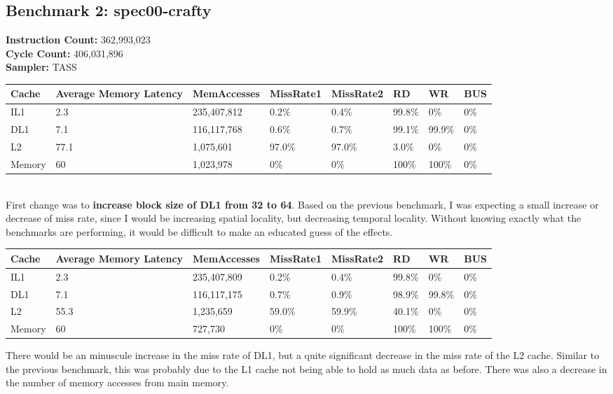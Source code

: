 \documentclass[12pt]{article}
\begin{document}
\subsection*{Benchmark 2: spec00-crafty}
\textbf{Instruction Count:} 362,993,023\\
\textbf{Cycle Count:} 406,031,896\\
\textbf{Sampler:} TASS\\
\begin{table}[!h]
\centering
\begin{tabular}{|l|l|l|l|l|l|l|l|}
\hline
\rowcolor[HTML]{C0C0C0} 
Cache & Average Memory Latency & MemAccesses & MissRate1 & MissRate2 & RD & WR & BUS \\ \hline
IL1 & 2.3 & 235,407,812 & 0.2\% & 0.4\% & 99.8\% & 0\% & 0\% \\ \hline
DL1 & 7.1 & 116,117,768 & 0.6\% & 0.7\% & 99.1\% & 99.9\% & 0\% \\ \hline
L2 & 77.1 & 1,075,601 & 97.0\% & 97.0\% & 3.0\% & 0\% & 0\% \\ \hline
Memory & 60 & 1,023,978 & 0\% & 0\% & 100\% & 100\% & 0\% \\ \hline
\end{tabular}
\end{table}\\
First change was to \textbf{increase block size of DL1 from 32 to 64}. Based on the previous benchmark, I was expecting a small increase or decrease of miss rate, since I would be increasing spatial locality, but decreasing temporal locality. Without knowing exactly what the benchmarks are performing, it would be difficult to make an educated guess of the effects.\\
\begin{table}[!h]
\centering
\begin{tabular}{|l|l|l|l|l|l|l|l|}
\hline
\rowcolor[HTML]{C0C0C0} 
Cache & Average Memory Latency & MemAccesses & MissRate1 & MissRate2 & RD & WR & BUS \\ \hline
IL1 & 2.3 & 235,407,809 & 0.2\% & 0.4\% & 99.8\% & 0\% & 0\% \\ \hline
DL1 & 7.1 & 116,117,175 & 0.7\% & 0.9\% & 98.9\% & 99.8\% & 0\% \\ \hline
L2 & 55.3 & 1,235,659 & 59.0\% & 59.9\% & 40.1\% & 0\% & 0\% \\ \hline
Memory & 60 & 727,730 & 0\% & 0\% & 100\% & 100\% & 0\% \\ \hline
\end{tabular}
\end{table}
There would be an minuscule increase in the miss rate of DL1, but a quite significant decrease in the miss rate of the L2 cache. Similar to the previous benchmark, this was probably due to the L1 cache not being able to hold as much data as before. There was also a decrease in the number of memory accesses from main memory.\\
\end{document}
